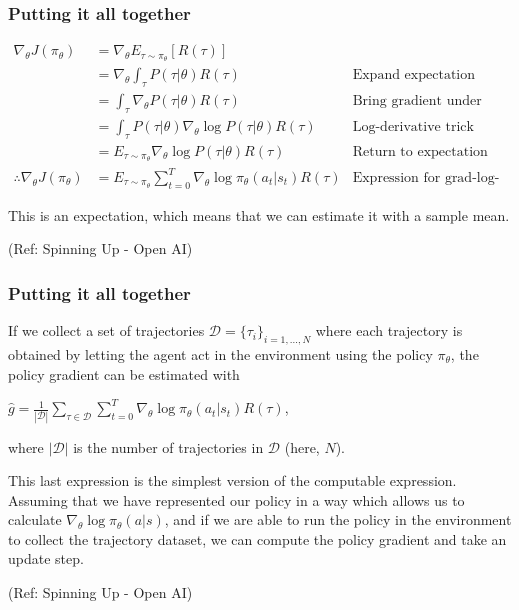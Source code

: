 \begin{frame}[fragile]\frametitle{Putting it all together}

\begin{align*}
\nabla_{\theta} J(\pi_{\theta}) &= \nabla_{\theta} E_{\tau \sim \pi_{\theta}}[R(\tau)] & \\
&= \nabla_{\theta} \int_{\tau} P(\tau|\theta) R(\tau) & \text{Expand expectation} \\
&= \int_{\tau} \nabla_{\theta} P(\tau|\theta) R(\tau) & \text{Bring gradient under integral} \\
&= \int_{\tau} P(\tau|\theta) \nabla_{\theta} \log P(\tau|\theta) R(\tau) & \text{Log-derivative trick} \\
&= E_{\tau \sim \pi_{\theta}}{\nabla_{\theta} \log P(\tau|\theta) R(\tau)} & \text{Return to expectation form} \\
\therefore \nabla_{\theta} J(\pi_{\theta}) &= E_{\tau \sim \pi_{\theta}}{\sum_{t=0}^{T} \nabla_{\theta} \log \pi_{\theta}(a_t |s_t) R(\tau)} & \text{Expression for grad-log-prob}
\end{align*}

This is an expectation, which means that we can estimate it with a sample mean.


{\tiny (Ref: Spinning Up - Open AI)}
\end{frame}

\begin{frame}[fragile]\frametitle{Putting it all together}

If we collect a set of trajectories $\mathcal{D} = \{\tau_i\}_{i=1,...,N}$ where each trajectory is obtained by letting the agent act in the environment using the policy $\pi_{\theta}$, the policy gradient can be estimated with

$\hat{g} = \frac{1}{|\mathcal{D}|} \sum_{\tau \in \mathcal{D}} \sum_{t=0}^{T} \nabla_{\theta} \log \pi_{\theta}(a_t |s_t) R(\tau)$,

where $|\mathcal{D}|$ is the number of trajectories in $\mathcal{D}$ (here, $N$).

This last expression is the simplest version of the computable expression. Assuming that we have represented our policy in a way which allows us to calculate $\nabla_{\theta} \log \pi_{\theta}(a|s)$, and if we are able to run the policy in the environment to collect the trajectory dataset, we can compute the policy gradient and take an update step.

{\tiny (Ref: Spinning Up - Open AI)}
\end{frame}



